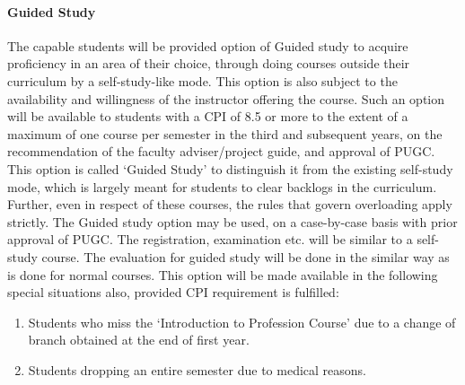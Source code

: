 \paragraph{Guided Study} The capable students will be provided option of Guided study to acquire proficiency in an area of their choice, through doing courses outside their curriculum by a self-study-like mode. This option is also subject to the availability and willingness of the instructor offering the course. Such an option will be available to students with a CPI of 8.5 or more to the extent of a maximum of one course per semester in the third and subsequent years, on the recommendation of the faculty adviser/project guide, and approval of PUGC. This option is called ‘Guided Study' to distinguish it from the existing self-study mode, which is largely meant for students to clear backlogs in the curriculum. Further, even in respect of these courses, the rules that govern overloading apply strictly. The Guided study option may be used, on a case-by-case basis with prior approval of PUGC. The registration, examination etc. will be similar to a self-study course. The evaluation for guided study will be done in the similar way as is done for normal courses. This option will be made available in the following special situations also, provided CPI requirement is fulfilled: 

\begin{enumerate} [leftmargin=15mm]
    \item Students who miss the ‘Introduction to Profession Course' due to a change of branch obtained at the end of first year. 
    \item Students dropping an entire semester due to medical reasons. 
\end{enumerate}